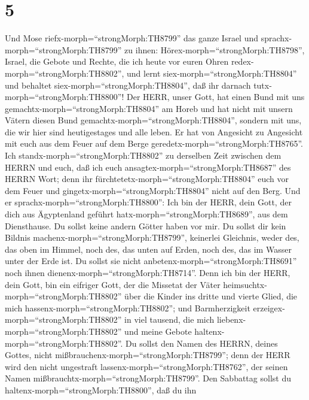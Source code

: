 \hypertarget{section-4}{%
\section{5}\label{section-4}}

 Und Mose riefx-morph=``strongMorph:TH8799'' das ganze
Israel und sprachx-morph=``strongMorph:TH8799'' zu ihnen:
Hörex-morph=``strongMorph:TH8798'', Israel, die Gebote und Rechte, die
ich heute vor euren Ohren redex-morph=``strongMorph:TH8802'', und lernt
siex-morph=``strongMorph:TH8804'' und behaltet
siex-morph=``strongMorph:TH8804'', daß ihr darnach
tutx-morph=``strongMorph:TH8800''!  Der HERR, unser Gott,
hat einen Bund mit uns gemachtx-morph=``strongMorph:TH8804'' am Horeb
 und hat nicht mit unsern Vätern diesen Bund
gemachtx-morph=``strongMorph:TH8804'', sondern mit uns, die wir hier
sind heutigestages und alle leben.  Er hat von Angesicht zu
Angesicht mit euch aus dem Feuer auf dem Berge
geredetx-morph=``strongMorph:TH8765''.  Ich
standx-morph=``strongMorph:TH8802'' zu derselben Zeit zwischen dem HERRN
und euch, daß ich euch ansagtex-morph=``strongMorph:TH8687'' des HERRN
Wort; denn ihr fürchtetetx-morph=``strongMorph:TH8804'' euch vor dem
Feuer und gingetx-morph=``strongMorph:TH8804'' nicht auf den Berg. Und
er sprachx-morph=``strongMorph:TH8800'':  Ich bin der HERR,
dein Gott, der dich aus Ägyptenland geführt
hatx-morph=``strongMorph:TH8689'', aus dem Diensthause.  Du
sollst keine andern Götter haben vor mir.  Du sollst dir
kein Bildnis machenx-morph=``strongMorph:TH8799'', keinerlei Gleichnis,
weder des, das oben im Himmel, noch des, das unten auf Erden, noch des,
das im Wasser unter der Erde ist.  Du sollst sie nicht
anbetenx-morph=``strongMorph:TH8691'' noch ihnen
dienenx-morph=``strongMorph:TH8714''. Denn ich bin der HERR, dein Gott,
bin ein eifriger Gott, der die Missetat der Väter
heimsuchtx-morph=``strongMorph:TH8802'' über die Kinder ins dritte und
vierte Glied, die mich hassenx-morph=``strongMorph:TH8802'';
 und Barmherzigkeit erzeigex-morph=``strongMorph:TH8802''
in viel tausend, die mich liebenx-morph=``strongMorph:TH8802'' und meine
Gebote haltenx-morph=``strongMorph:TH8802''.  Du sollst den
Namen des HERRN, deines Gottes, nicht
mißbrauchenx-morph=``strongMorph:TH8799''; denn der HERR wird den nicht
ungestraft lassenx-morph=``strongMorph:TH8762'', der seinen Namen
mißbrauchtx-morph=``strongMorph:TH8799''.  Den Sabbattag
sollst du haltenx-morph=``strongMorph:TH8800'', daß du ihn
